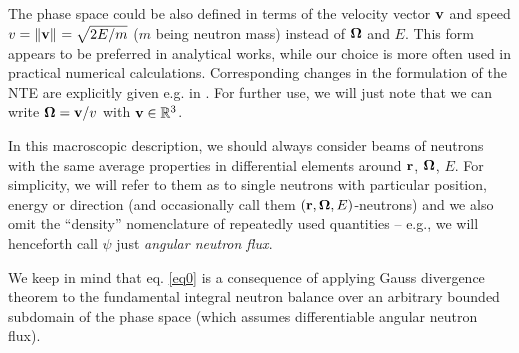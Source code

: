\begin{remark}
	The phase space could be also defined in terms of the velocity vector $\bv$ and speed $v = \norm{\bv} = \sqrt{2E/m}$
	($m$ being neutron mass) instead of $\bomega$ and $E$. 
	This form appears to be preferred in analytical works, while our choice is more often used in practical numerical
	calculations.
	Corresponding changes in the formulation of the NTE are
	explicitly given e.g. in \cite[Chap. XXI, eqns. (1.1) and (1.2)]{DautrayLions}. For further use, we will just note
	that we can write $\bomega = \bv / v$ with $\bv\in\R[3]$.
\end{remark} 
\begin{remark}
	In this macroscopic description, we should always consider beams of neutrons with the same average properties in
	differential elements around $\br$, $\bomega$, $E$. For simplicity, we will refer to them as to single neutrons with
	particular position, energy or direction (and occasionally call them $(\br,\bomega,E)$-neutrons) and we also omit the
	``density'' nomenclature of repeatedly used quantities -- e.g., we will henceforth call $\psi$ just \textit{angular
	neutron flux}.
\end{remark} 
\begin{remark}\label{rem:balance}
	We keep in mind that eq. \eqref{eq0} is a consequence of applying Gauss divergence
	theorem to the fundamental integral neutron balance over an arbitrary bounded subdomain of the phase space (which
	assumes differentiable angular neutron flux).
\end{remark}

